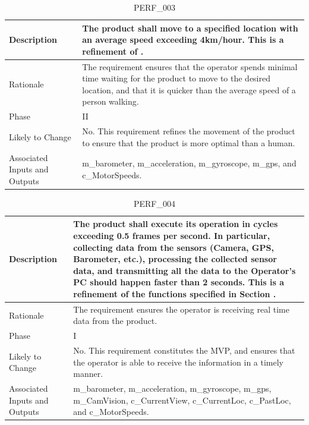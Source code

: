 \documentclass{article}
\begin{document}
\begin{table}[!h]
\begin{center}
\caption {PERF\_003} 
\label{PERF_003}
\begin{tabular}{ | m{3cm} | m{11cm} | }
\hline
Description & The product shall move to a specified location with an average speed exceeding 4km/hour. This is a refinement of \nameref{STA_011}. \\
\hline
Rationale & The requirement ensures that the operator spends minimal time waiting for the product to move to the desired location, and that it is quicker than the average speed of a person walking.  \\
\hline
Phase & II \\
\hline
Likely to Change & No. This requirement refines the movement of the product to ensure that the product is more optimal than a human. \\
\hline
Associated Inputs and Outputs & m\_barometer, m\_acceleration, m\_gyroscope, m\_gps, and c\_MotorSpeeds.  \\
\hline
\end{tabular}
\end{center}
\end{table}

\begin{table}[!h]
\begin{center}
\caption {PERF\_004} 
\label{PERF_004}
\begin{tabular}{ | m{3cm} | m{11cm} | }
\hline
Description & The product shall execute its operation in cycles exceeding 0.5 frames per second. In particular, collecting data from the sensors (Camera, GPS, Barometer, etc.), processing the collected sensor data, and transmitting all the data to the Operator's PC should happen faster than 2 seconds. This is a refinement of the functions specified in Section \nameref{subsec:ProdFunc}. \\
\hline
Rationale & The requirement ensures the operator is receiving real time data from the product. \\
\hline
Phase & I \\
\hline
Likely to Change & No. This requirement constitutes the MVP, and ensures that the operator is able to receive the information in a timely manner. \\
\hline
Associated Inputs and Outputs & m\_barometer, m\_acceleration, m\_gyroscope, m\_gps, m\_CamVision, c\_CurrentView, c\_CurrentLoc, c\_PastLoc, and c\_MotorSpeeds.  \\
\hline
\end{tabular}
\end{center}
\end{table}
\end{document}
